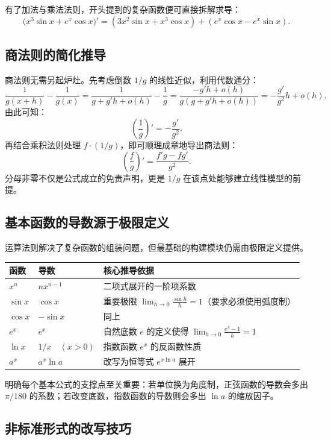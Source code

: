 有了加法与乘法法则，开头提到的复杂函数便可直接拆解求导：
\[
\bigl(x^3\sin x+e^x\cos x\bigr)'=(3x^2\sin x+x^3\cos x)+(e^x\cos x-e^x\sin x).
\]

\subsection{商法则的简化推导}

商法则无需另起炉灶。先考虑倒数 $1/g$ 的线性近似，利用代数通分：
\[
\frac{1}{g(x+h)} - \frac{1}{g(x)} = \frac{1}{g + g'h + o(h)} - \frac{1}{g} = \frac{-g'h + o(h)}{g(g + g'h + o(h))} = -\frac{g'}{g^2}h + o(h).
\]
由此可知：
\[
\left(\frac{1}{g}\right)' = -\frac{g'}{g^2}.
\]
再结合乘积法则处理 $f \cdot (1/g)$，即可顺理成章地导出商法则：
\[
\left(\frac{f}{g}\right)' = \frac{f'g - fg'}{g^2}.
\]
分母非零不仅是公式成立的免责声明，更是 $1/g$ 在该点处能够建立线性模型的前提。

\subsection{基本函数的导数源于极限定义}

运算法则解决了复杂函数的组装问题，但最基础的构建模块仍需由极限定义提供。

{\def\LTcaptype{none}
\begin{longtable}{@{}lll@{}}
\toprule
函数 & 导数 & 核心推导依据 \\
\midrule
\(x^n\) & \(nx^{n-1}\) & 二项式展开的一阶项系数 \\
\(\sin x\) & \(\cos x\) & 重要极限 \(\lim_{h\to0}\frac{\sin h}{h}=1\)（要求必须使用弧度制） \\
\(\cos x\) & \(-\sin x\) & 同上 \\
\(e^x\) & \(e^x\) & 自然底数 \(e\) 的定义使得 \(\lim_{h\to0}\frac{e^h-1}{h}=1\) \\
\(\ln x\) & \(1/x\quad (x>0)\) & 指数函数 \(e^x\) 的反函数性质 \\
\(a^x\) & \(a^x\ln a\) & 改写为恒等式 \(e^{x\ln a}\) 展开 \\
\bottomrule
\end{longtable}
}

明确每个基本公式的支撑点至关重要：若单位换为角度制，正弦函数的导数会多出 \(\pi/180\) 的系数；若改变底数，指数函数的导数则会多出 \(\ln a\) 的缩放因子。

\subsection{非标准形式的改写技巧}

